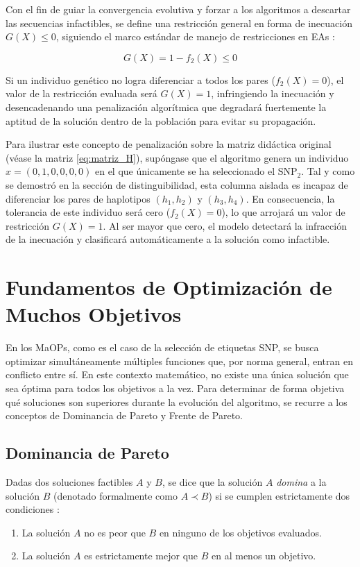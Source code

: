 Con el fin de guiar la convergencia evolutiva y forzar a los algoritmos a descartar las secuencias infactibles, se define una restricción general en forma de inecuación $G(X) \le 0$, siguiendo el marco estándar de manejo de restricciones en EAs \cite{deb2001multiobjective}:

\begin{equation}
    G(X) = 1 - f_2(X) \le 0
\end{equation}

Si un individuo genético no logra diferenciar a todos los pares ($f_2(X) = 0$), el valor de la restricción evaluada será $G(X) = 1$, infringiendo la inecuación y desencadenando una penalización algorítmica que degradará fuertemente la aptitud de la solución dentro de la población para evitar su propagación.

Para ilustrar este concepto de penalización sobre la matriz didáctica original (véase la matriz \ref{eq:matriz_H}), supóngase que el algoritmo genera un individuo $x = (0, 1, 0, 0, 0, 0)$ en el que únicamente se ha seleccionado el $\text{SNP}_2$. Tal y como se demostró en la sección de distinguibilidad, esta columna aislada es incapaz de diferenciar los pares de haplotipos $(h_1, h_2)$ y $(h_3, h_4)$. En consecuencia, la tolerancia de este individuo será cero ($f_2(X) = 0$), lo que arrojará un valor de restricción $G(X) = 1$. Al ser mayor que cero, el modelo detectará la infracción de la inecuación y clasificará automáticamente a la solución como infactible.

\section{Fundamentos de Optimización de Muchos Objetivos}

En los MaOPs, como es el caso de la selección de etiquetas SNP, se busca optimizar simultáneamente múltiples funciones que, por norma general, entran en conflicto entre sí. En este contexto matemático, no existe una única solución que sea óptima para todos los objetivos a la vez. Para determinar de forma objetiva qué soluciones son superiores durante la evolución del algoritmo, se recurre a los conceptos de Dominancia de Pareto y Frente de Pareto.

\subsection{Dominancia de Pareto}
Dadas dos soluciones factibles $A$ y $B$, se dice que la solución $A$ \textit{domina} a la solución $B$ (denotado formalmente como $A \prec B$) si se cumplen estrictamente dos condiciones \cite{deb2001multiobjective}:
\begin{enumerate}
    \item La solución $A$ no es peor que $B$ en ninguno de los objetivos evaluados.
    \item La solución $A$ es estrictamente mejor que $B$ en al menos un objetivo.
\end{enumerate}

